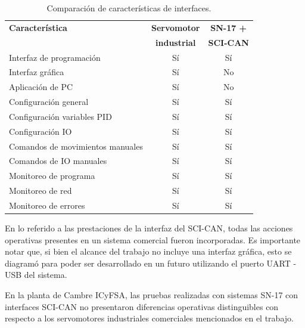 \begin{table}[h!]
	\centering
	\caption[Comparación de características de interfaces]{Comparación de características de interfaces.}
	\begin{tabular}{p{7 cm} c c}
		\toprule
		\centering \multirow{2}{*} {\textbf{Característica}}  & \textbf{Servomotor} & \textbf{SN-17 +} \\
										  & \textbf{industrial} & \textbf{SCI-CAN}  \\	
		\midrule
		Interfaz de programación & Sí & Sí \\
		Interfaz gráfica & Sí & No \\
		Aplicación de PC & Sí & No \\
		Configuración general & Sí & Sí \\
		Configuración variables PID & Sí & Sí \\
		Configuración IO & Sí & Sí \\
		Comandos de movimientos manuales & Sí & Sí \\
		Comandos de IO manuales & Sí & Sí \\
		Monitoreo de programa & Sí & Sí \\
		Monitoreo de red & Sí & Sí \\
		Monitoreo de errores & Sí & Sí \\
		\bottomrule
		\hline
	\end{tabular}
	\label{tab:comparacion_interfaces}
\end{table}

En lo referido a las prestaciones de la interfaz del SCI-CAN, todas las acciones operativas presentes en un sistema comercial fueron incorporadas. Es importante notar que, si bien el alcance del trabajo no incluye una interfaz gráfica, esto se diagramó para poder ser desarrollado en un futuro utilizando el puerto UART - USB del sistema.

En la planta de Cambre ICyFSA, las pruebas realizadas con sistemas SN-17 con interfaces SCI-CAN no presentaron diferencias operativas distinguibles con respecto a los servomotores industriales comerciales mencionados en el trabajo.
